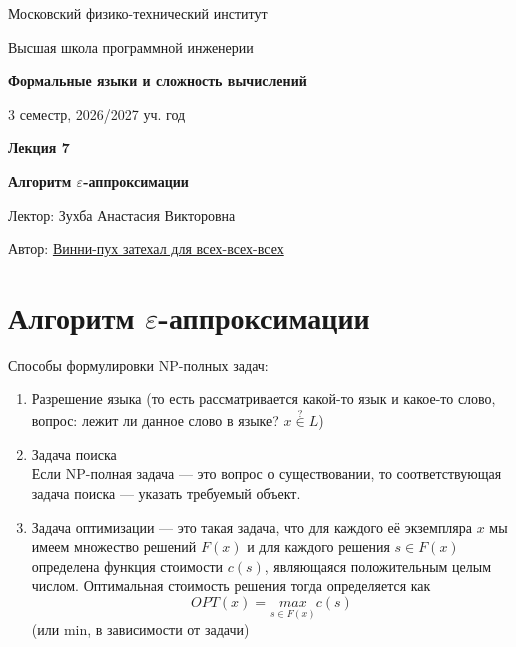 \documentclass[11pt]{article}
\newcommand{\lectureNumber}{7}
\newcommand{\lectureTitle}{Алгоритм $\varepsilon$-аппроксимации}
\newcommand{\courseName}{Формальные языки и сложность вычислений}
\newcommand{\semester}{3 семестр, 2026/2027 уч. год}
\begin{document}
\begin{titlepage}
    \centering
    
    {\large Московский физико-технический институт \par}
    {\large Высшая школа программной инженерии \par}
    \vspace{2cm}

    {\Large \textbf{\courseName} \par}
    {\large \semester \par}
    
    \vspace*{\fill}

    {\Huge \textbf{Лекция \lectureNumber} \par}
    {\Huge \textbf{\lectureTitle} \par}
    
    \vspace*{\fill}
    
    {\large Лектор: Зухба Анастасия Викторовна \par}
    {\large Автор: \href{https://t.me/mallina_olga}{Винни-пух затехал для всех-всех-всех} \par}

\end{titlepage}


\section{Алгоритм $\varepsilon$-аппроксимации}

Способы формулировки NP-полных задач:
\begin{enumerate}
    \item Разрешение языка (то есть рассматривается какой-то язык и какое-то слово, вопрос: лежит ли данное слово в языке? $x \overset{?}{\in} L$)
    \item Задача поиска\\
    Если NP-полная задача --- это вопрос о существовании, то соответствующая задача поиска --- указать требуемый объект. 
    \item Задача оптимизации --- это такая задача, что для каждого её экземпляра $x$ мы имеем множество решений $F(x)$ и для каждого решения $s\in F(x)$ определена функция стоимости $c(s)$, являющаяся положительным целым числом. Оптимальная стоимость решения тогда определяется как
    \[ OPT(x) = \underset{s\in F(x)}{max} c(s) \]  
    (или min, в зависимости от задачи)
\end{enumerate}
\end{document}
